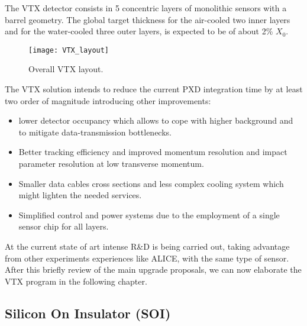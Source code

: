 The VTX detector consists in 5 concentric layers of monolithic sensors with a barrel geometry. The global target thickness for the air-cooled two inner layers and for the water-cooled three outer layers, is expected to be of about 2\% $X_{0}$.

\begin{figure}[h!]
\centering
\texttt{[image: VTX\_layout]}
\caption{Overall VTX layout.}
\label{fig:VTX_layout}
\end{figure}

The VTX solution intends to reduce the current PXD integration time by at least two order of magnitude introducing other improvements:

\begin{itemize}
\item lower detector occupancy which allows to cope with higher background and to mitigate data-transmission bottlenecks.
\item Better tracking efficiency and improved momentum resolution and impact parameter resolution at low transverse momentum.
\item Smaller data cables cross sections and less complex cooling system which might lighten the needed services.
\item Simplified control and power systems due to the employment of a single sensor chip for all layers.
\end{itemize}

At the current state of art intense R\&D is being carried out, taking advantage from other experiments experiences like ALICE, with the same type of sensor.\\

After this briefly review of the main upgrade proposals, we can now elaborate the VTX program in the following chapter.

\begin{comment}
Among all these options that we sift through, the last one has been chosen for the future upgrade of the vertex detector. The first two proposals have now been abandoned, the one that contemplates the use of the SOI technology instead, is considered as a backup option. \\
\end{comment}


\subsection{Silicon On Insulator (SOI)}

